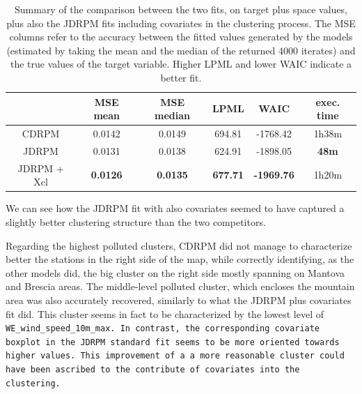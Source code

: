 \documentclass[12pt,	%
	a4paper,		%
	twoside,		%
	openright,		%
	titlepage,%
	]{book}
\theoremstyle{definition}
\begin{document}
\begin{table}[!ht]
    \caption[Accuracy metrics of CDRPM and JDRPM fits, target plus space values, with vs without covariates in the clustering process]{Summary of the comparison between the two fits, on target plus space values, plus also the JDRPM fits including covariates in the clustering process. The MSE columns refer to the accuracy between the fitted values generated by the models (estimated by taking the mean and the median of the returned 4000 iterates) and the true values of the target variable. Higher LPML and lower WAIC indicate a better fit.}
    \centering
    \begin{tabular}{cccccc}
    \toprule
           & MSE mean &  MSE median & LPML & WAIC & exec. time  \\
           \midrule
        CDRPM &   0.0142   & 0.0149   &  694.81 & -1768.42 & 1h38m\\
        JDRPM & 0.0131  & 0.0138   & 624.91 & -1898.05  &  \textbf{48m}\\
        JDRPM + Xcl & \textbf{0.0126}  & \textbf{0.0135}  & \textbf{677.71} & \textbf{-1969.76}  &  1h20m\\
        \bottomrule
    \end{tabular}
    \label{tab: fits metrics space all with also Xcl}
\end{table}


We can see how the JDRPM fit with also covariates seemed to have captured a slightly better clustering structure than the two competitors. 

Regarding the highest polluted clusters, CDRPM did not manage to characterize better the stations in the right side of the map, while correctly identifying, as the other models did, the big cluster on the right side mostly spanning on Mantova and Brescia areas. The middle-level polluted cluster, which encloses the mountain area was also accurately recovered, similarly to what the JDRPM plus covariates fit did. This cluster seems in fact to be characterized by the lowest level of \tt{WE\_wind\_speed\_10m\_max}. In contrast, the corresponding covariate boxplot in the JDRPM standard fit seems to be more oriented towards higher values. This improvement of a a more reasonable cluster could have been ascribed to the contribute of covariates into the clustering. 
\end{document}
